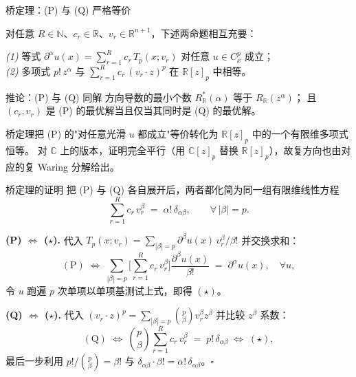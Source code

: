 \documentclass[10pt,aspectratio=169]{beamer}
\newcommand{\R}{\mathbb{R}}
\newcommand{\C}{\mathbb{C}}
\newcommand{\Tp}{T_p}
\newcommand{\dal}{\partial^{\alpha}}
\begin{document}
\begin{frame}{桥定理：(P) 与 (Q) 严格等价}
  \begin{theorem}
  对任意 $R\in\mathbb{N}$、$c_r\in\R$、$v_r\in\R^{n+1}$，下述两命题相互充要：

  \medskip
  \emph{(1)}\;\; 等式 $\dal u(x)=\sum_{r=1}^{R}c_r\,\Tp(x;v_r)$ 对任意 $u\in C^p_x$ 成立；\\[2pt]
  \emph{(2)}\;\; 多项式 $p!\,z^{\alpha}$ 与 $\sum_{r=1}^{R}c_r\,(v_r\!\cdot\!z)^p$ 在 $\R[z]_p$ 中相等。
  \end{theorem}

  \medskip
  \begin{block}{推论：(P) 与 (Q) 同解}
  方向导数的最小个数 $R^{\ast}_\R(\alpha)$ 等于 $R_\R(z^\alpha)$；
  且 $(c_r,v_r)$ 是 (P) 的最优解当且仅当其同时是 (Q) 的最优解。
  \end{block}

  \medskip
  桥定理把 (P) 的"对任意光滑 $u$ 都成立"等价转化为 $\R[z]_p$ 中的一个有限维多项式恒等。
  对 $\C$ 上的版本，证明完全平行（用 $\C[z]_p$ 替换 $\R[z]_p$），故复方向也由对应的复 Waring 分解给出。
\end{frame}

\begin{frame}{桥定理的证明}
  把 (P) 与 (Q) 各自展开后，两者都化简为同一组有限维线性方程
  \[
     \sum_{r=1}^{R} c_r\, v_r^{\beta} \;=\; \alpha!\,\delta_{\alpha\beta},
     \qquad \forall\,|\beta|=p.
     \tag{$\star$}
  \]

  \medskip
  \textbf{(P) $\Leftrightarrow$ ($\star$).}\;
  代入 $\Tp(x;v_r)=\sum_{|\beta|=p}\partial^{\beta}u(x)\,v_r^{\beta}/\beta!$ 并交换求和：
  \[
     (\text{P}) \;\Longleftrightarrow\;
     \sum_{|\beta|=p}\Big[\sum_{r=1}^{R}c_r\, v_r^{\beta}\Big]
        \frac{\partial^{\beta}u(x)}{\beta!}
        \;=\; \dal u(x), \quad \forall u,
  \]
  令 $u$ 跑遍 $p$ 次单项以单项基测试上式，即得 $(\star)$。

  \medskip
  \textbf{(Q) $\Leftrightarrow$ ($\star$).}\;
  代入 $(v_r\!\cdot\!z)^p=\sum_{|\beta|=p}\binom{p}{\beta}v_r^{\beta}z^{\beta}$ 并比较 $z^{\beta}$ 系数：
  \[
     (\text{Q}) \;\Longleftrightarrow\;
     \binom{p}{\beta}\sum_{r=1}^{R}c_r\, v_r^{\beta} \;=\; p!\,\delta_{\alpha\beta}
     \;\Longleftrightarrow\; (\star),
  \]
  最后一步利用 $p!/\binom{p}{\beta}=\beta!$ 与 $\delta_{\alpha\beta}\cdot\beta!=\alpha!\,\delta_{\alpha\beta}$。\hfill$\square$
\end{frame}
\end{document}
